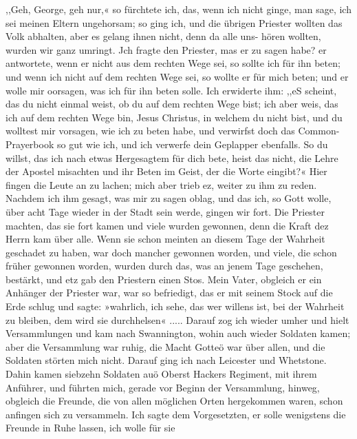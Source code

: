 ,,Geh, George, geh nur,« so fürchtete ich, das, wenn ich nicht
ginge, man sage, ich sei meinen Eltern ungehorsam; so ging ich,
und die übrigen Priester wollten das Volk abhalten, aber es
gelang ihnen nicht, denn da alle uns- hören wollten, wurden wir
ganz umringt. Jch fragte den Priester, mas er zu sagen habe?
er antwortete, wenn er nicht aus dem rechten Wege sei, so sollte
ich für ihn beten; und wenn ich nicht auf dem rechten Wege sei,
so wollte er für mich beten; und er wolle mir oorsagen, was ich
für ihn beten solle. Ich erwiderte ihm: ,,eS scheint, das du nicht
einmal weist, ob du auf dem rechten Wege bist; ich aber weis,
das ich auf dem rechten Wege bin, Jesus Christus, in welchem
du nicht bist, und du wolltest mir vorsagen, wie ich zu beten
habe, und verwirfst doch das Common-Prayerbook so gut wie ich,
und ich verwerfe dein Geplapper ebenfalls. So du willst, das ich
nach etwas Hergesagtem für dich bete, heist das nicht, die Lehre
der Apostel misachten und ihr Beten im Geist, der die Worte
eingibt?« Hier fingen die Leute an zu lachen; mich aber trieb
ez, weiter zu ihm zu reden. Nachdem ich ihm gesagt, was
mir zu sagen oblag, und das ich, so Gott wolle, über acht Tage wieder
in der Stadt sein werde, gingen wir fort. Die Priester machten,
das sie fort kamen und viele wurden gewonnen, denn die Kraft dez
Herrn kam über alle. Wenn sie schon meinten an diesem Tage
der Wahrheit geschadet zu haben, war doch mancher gewonnen
worden, und viele, die schon früher gewonnen worden, wurden durch
das, was an jenem Tage geschehen, bestärkt, und etz gab den
Priestern einen Stos. Mein Vater, obgleich er ein Anhänger der
Priester war, war so befriedigt, das er mit seinem Stock auf die
Erde schlug und sagte: »wahrlich, ich sehe, das wer willens ist,
bei der Wahrheit zu bleiben, dem wird sie durchhelsen« .....
Darauf zog ich wieder umher und hielt Versammlungen und
kam nach Swannington, wohin auch wieder Soldaten kamen;
aber die Versammlung war ruhig, die Macht Gotteö war
über allen, und die Soldaten störten mich nicht. Darauf ging
ich nach Leicester und Whetstone. Dahin kamen siebzehn Soldaten
auö Oberst Hackers Regiment, mit ihrem Anführer, und führten
mich, gerade vor Beginn der Versammlung, hinweg, obgleich die
Freunde, die von allen möglichen Orten hergekommen waren,
schon anfingen sich zu versammeln. Ich sagte dem Vorgesetzten,
er solle wenigstens die Freunde in Ruhe lassen, ich wolle für sie


